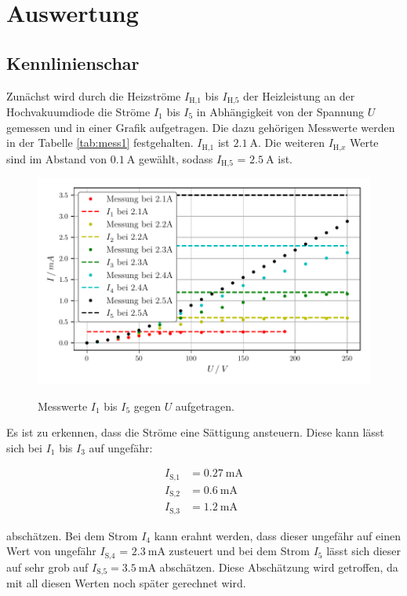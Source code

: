 \newpage
\section{Auswertung}
\subsection{Kennlinienschar}
Zunächst wird durch die Heizströme $I_{\text{H,}1}$ bis $I_{\text{H,}5}$ der Heizleistung an der Hochvakuumdiode die Ströme $I_1$ bis $I_5$ in Abhängigkeit von der Spannung $U$ gemessen und 
in einer Grafik aufgetragen. Die dazu gehörigen Messwerte werden in der Tabelle \ref{tab:mess1} festgehalten. $I_{\text{H,}1}$ ist $\SI{2.1}{\ampere}$. Die weiteren $I_{\text{H,}x}$ Werte sind im Abstand von 
$\SI{0.1}{\ampere}$ gewählt, sodass $I_{\text{H,}5}$ = $\SI{2.5}{\ampere}$ ist.

\begin{figure}
    \centering
    \includegraphics[width=\textwidth]{Daten/kennlinie.pdf}
    \label{fig:kennlinie}
    \caption{Messwerte $I_1$ bis $I_5$ gegen $U$ aufgetragen.}
\end{figure}

Es ist zu erkennen, dass die Ströme eine Sättigung ansteuern. Diese kann lässt sich bei $I_{1}$ bis $I_{3}$ auf ungefähr:

\begin{align*}
    I_\text{S,1} &= \SI{0.27 }{\milli\ampere} \\
    I_\text{S,2} &= \SI{0.6}{\milli\ampere} \\
    I_\text{S,3} &= \SI{1.2}{\milli\ampere}
  \end{align*}

  abschätzen. Bei dem Strom $I_{4}$ kann erahnt werden, dass dieser ungefähr auf einen Wert von ungefähr $I_\text{S,4}$ = $\SI{2.3}{\milli\ampere}$ zusteuert 
  und bei dem Strom $I_{5}$ lässt sich dieser auf sehr grob auf $I_\text{S,5} = \SI{3.5}{\milli\ampere}$ abschätzen. Diese Abschätzung wird getroffen, da mit all diesen Werten noch später gerechnet wird.

